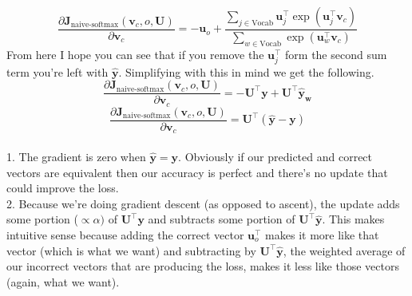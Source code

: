 \documentclass[12pt]{article}
\begin{document}
\begin{equation*}
    \frac{\partial \bm J_{\text{naive-softmax}}(\bm v_c, o, \bm U)}{\partial \bm v_c} = 
    - \bm u_{o} +
    \frac{\sum_{j \in \text{Vocab}} \bm u_{j}^\top \exp(\bm u_{j}^\top \bm v_c)}{\sum_{w \in \text{Vocab}} \exp(\bm u_{w}^\top \bm v_c)}
\end{equation*}
From here I hope you can see that if you remove the $\bm u_j^\top$ form the second sum term 
you're left with $\bm {\hat y}$. Simplifying with this in mind we get the following.
\begin{equation*}
    \frac{\partial \bm J_{\text{naive-softmax}}(\bm v_c, o, \bm U)}{\partial \bm v_c} = 
    - \bm U^\top \bm y + \bm U^\top \bm {\hat y_w}
\end{equation*}
\begin{equation*}
    \frac{\partial \bm J_{\text{naive-softmax}}(\bm v_c, o, \bm U)}{\partial \bm v_c} = 
    \bm U^\top (\bm {\hat y} - \bm y)
\end{equation*}
~\\
1. The gradient is zero when $\bm {\hat y} = \bm y$. Obviously if our predicted and correct vectors 
are equivalent then our accuracy is perfect and there's no update that could improve the loss.
~\\
2. Because we're doing gradient descent (as opposed to ascent), the update adds some portion ($\propto \alpha)$ of 
$\bm U^\top \bm y$ and subtracts some portion of $\bm U^\top \bm {\hat y}$. This makes 
intuitive sense because adding the correct vector $\bm u_o^\top$ makes it more like that vector (which is what we want) and 
subtracting by $\bm U^\top \bm {\hat y}$, the weighted average of our incorrect vectors that are 
producing the loss, makes it less like those vectors (again, what we want). 

\end{document}
